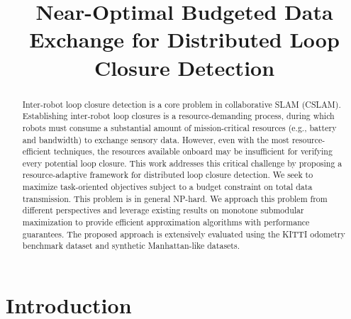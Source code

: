 \documentclass[conference]{IEEEtran}
\begin{document}
\title{\Large Near-Optimal Budgeted Data Exchange for Distributed Loop Closure Detection}

\author{\vspace{0.15cm}
}

\maketitle

\begin{abstract}
  Inter-robot loop closure detection is a core problem in collaborative SLAM
  (CSLAM). 
  Establishing inter-robot loop closures is a resource-demanding
  process,  
  during which robots must consume a substantial amount of
  mission-critical resources (e.g., battery and bandwidth)
  to exchange sensory
  data. However, 
  even with the most resource-efficient techniques,
  the resources available onboard may be insufficient for verifying
  every potential loop closure. This work addresses this critical challenge by proposing a 
  resource-adaptive framework for distributed loop closure detection.
  We seek to maximize task-oriented objectives subject to a budget constraint on total data transmission.
  This problem is in general NP-hard.
  We approach this problem from different perspectives and leverage existing results on
  monotone submodular maximization to provide efficient approximation algorithms
  with performance guarantees. 
  The proposed approach is extensively evaluated using the KITTI odometry benchmark
  dataset and synthetic Manhattan-like datasets. 
\end{abstract}


\IEEEpeerreviewmaketitle

\section{Introduction}
\label{sec: intro}
\end{document}
